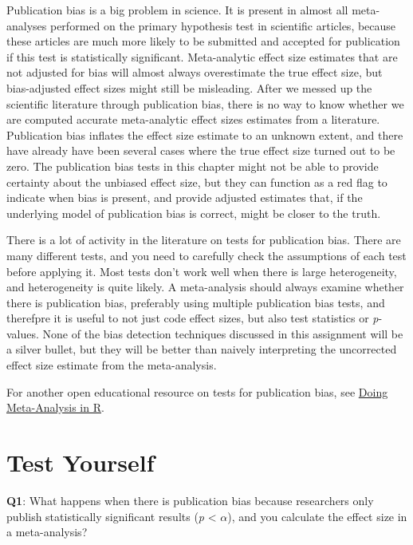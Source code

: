 \documentclass[
  oneside]{book}
\begin{document}
Publication bias is a big problem in science. It is present in almost all meta-analyses performed on the primary hypothesis test in scientific articles, because these articles are much more likely to be submitted and accepted for publication if this test is statistically significant. Meta-analytic effect size estimates that are not adjusted for bias will almost always overestimate the true effect size, but bias-adjusted effect sizes might still be misleading. After we messed up the scientific literature through publication bias, there is no way to know whether we are computed accurate meta-analytic effect sizes estimates from a literature. Publication bias inflates the effect size estimate to an unknown extent, and there have already have been several cases where the true effect size turned out to be zero. The publication bias tests in this chapter might not be able to provide certainty about the unbiased effect size, but they can function as a red flag to indicate when bias is present, and provide adjusted estimates that, if the underlying model of publication bias is correct, might be closer to the truth.

There is a lot of activity in the literature on tests for publication bias. There are many different tests, and you need to carefully check the assumptions of each test before applying it. Most tests don't work well when there is large heterogeneity, and heterogeneity is quite likely. A meta-analysis should always examine whether there is publication bias, preferably using multiple publication bias tests, and therefpre it is useful to not just code effect sizes, but also test statistics or \emph{p}-values. None of the bias detection techniques discussed in this assignment will be a silver bullet, but they will be better than naively interpreting the uncorrected effect size estimate from the meta-analysis.

For another open educational resource on tests for publication bias, see \href{https://bookdown.org/MathiasHarrer/Doing_Meta_Analysis_in_R/pub-bias.html}{Doing Meta-Analysis in R}.

\hypertarget{test-yourself-10}{%
\section{Test Yourself}\label{test-yourself-10}}

\textbf{Q1}: What happens when there is publication bias because researchers only
publish statistically significant results (\emph{p} \textless{} \(\alpha\)), and you calculate the effect size in a meta-analysis?
\end{document}

